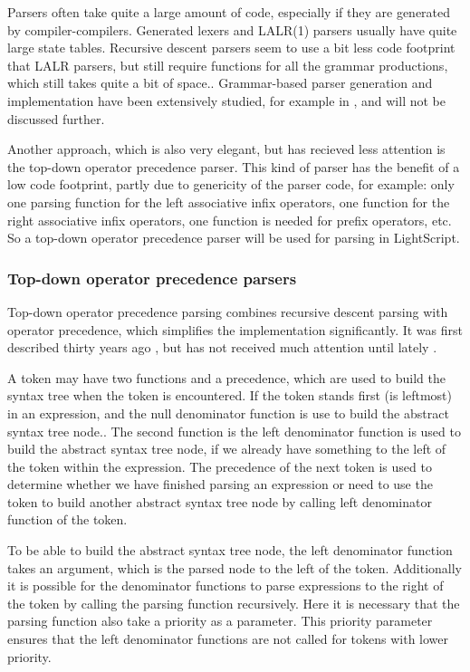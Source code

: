 \documentclass[11pt]{report}
\begin{document}
Parsers often take quite a large amount of code, especially if they are generated by compiler-compilers.
Generated lexers and LALR(1) parsers usually have quite large state tables.
Recursive descent parsers seem to use a bit less code footprint that LALR parsers, but still require functions for all the grammar productions, which still takes quite a bit of space..
Grammar-based parser generation and implementation have been extensively studied, for example in  \cite{basics-of-compiler-design}, and will not be discussed further.

Another approach, which is also very elegant, 
but has recieved less attention is the
top-down operator precedence parser.
This kind of parser has the benefit of a low code footprint,
partly due to genericity of the parser code,
for example: only one parsing
function for the left associative infix operators,
one function for the right associative infix operators,
one function is needed for prefix operators, etc.
So a top-down operator precedence parser will be used for parsing in LightScript.

\subsubsection{Top-down operator precedence parsers}
\label{tdop}
Top-down operator precedence parsing combines recursive descent parsing with operator precedence, which simplifies the implementation significantly.
It was first described thirty years ago \cite{top-down-operator-precedence}, but has not received much attention until lately \cite{beautiful-code, crockford-jslint}.


A token may have two functions and a precedence, which are used to build the syntax tree when the token is encountered.
If the token stands first (is leftmost) in an expression, and the null denominator function is use to build the abstract syntax tree node..
The second function is the left denominator function is used to build the abstract syntax tree node, if we already have something to the left of the token within the expression.
The precedence of the next token is used to determine whether we have finished parsing an expression or need to use the token to build another abstract syntax tree node by calling left denominator function of the token.

To be able to build the abstract syntax tree node, the left denominator function takes an argument, which is the parsed node to the left of the token. Additionally it is possible for the denominator functions to parse expressions to the right of the token by calling the parsing function recursively. Here it is necessary that the parsing function also take a priority as a parameter. This priority parameter ensures that the left denominator functions are not called for tokens with lower priority.
\end{document}
